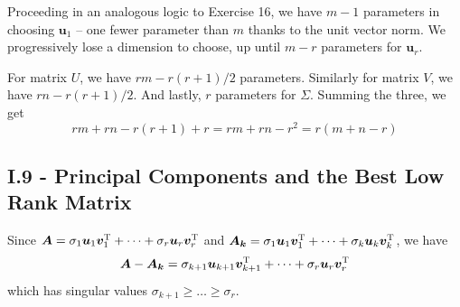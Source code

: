 \documentclass[a4paper]{article}
\begin{document}
Proceeding in an analogous logic to Exercise 16, we have \(m - 1\) parameters in choosing \(\bm{u}_{1}\) -- one fewer parameter than \(m\) thanks to the unit vector norm. We progressively lose a dimension to choose, up until \(m - r\) parameters for \(\bm{u}_{r}\).

For matrix \(U\), we have \(rm - r \!\left( r + 1 \right) / 2\) parameters. Similarly for matrix \(V\), we have \(rn - r \!\left( r + 1 \right) / 2\). And lastly, \(r\) parameters for \(\Sigma\). Summing the three, we get
\[
	rm + rn - r \!\left( r + 1 \right) + r = rm + rn - r^{2} = r \!\left( m + n - r \right) 
\]


\newpage
\subsection{\textsf{I.9 - Principal Components and the Best Low Rank Matrix}}


Since \(\bm{A} = \sigma_{1}\bm{u}_{1}\bm{v}_{1}^{\textsc{T}} + \cdots + \sigma_{r}\bm{u}_{r}\bm{v}_{r}^{\textsc{T}}\) and \(\bm{A_{k}} = \sigma_{1}\bm{u}_{1}\bm{v}_{1}^{\textsc{T}} + \cdots + \sigma_{k}\bm{u}_{k}\bm{v}_{k}^{\textsc{T}}\), we have
\[
	\bm{A} - \bm{A_{k}} = \sigma_{k+1}\bm{u}_{k+1}\bm{v}_{k+1}^{\textsc{T}} + \cdots + \sigma_{r}\bm{u}_{r}\bm{v}_{r}^{\textsc{T}}
\]
which has singular values \(\sigma_{k+1} \ge \ldots \ge \sigma_{r}\).

\vspace{12pt}

\end{document}
